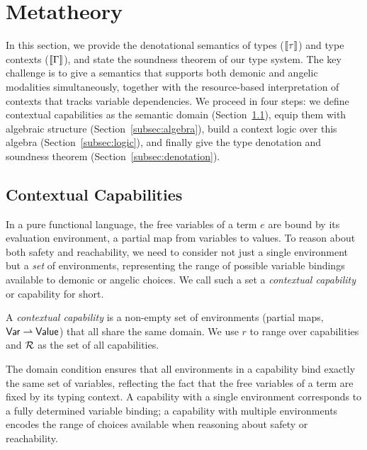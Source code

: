 \section{Metatheory} %
\label{sec:meta}

In this section, we provide the denotational semantics of types
($\llbracket {\tau} \rrbracket$) and type contexts ($\llbracket {\Gamma} \rrbracket$), and state the
soundness theorem of our type system.  The key challenge is to give a
semantics that supports both demonic and angelic modalities
simultaneously, together with the resource-based interpretation of
contexts that tracks variable dependencies.  We proceed in four
steps: we define contextual capabilities as the semantic domain
(Section~\ref{subsec:capabilities}), equip them with algebraic structure
(Section~\ref{subsec:algebra}), build a context logic over this algebra
(Section~\ref{subsec:logic}), and finally give the type denotation and
soundness theorem (Section~\ref{subsec:denotation}).

\subsection{Contextual Capabilities}%
\label{subsec:capabilities}

In a pure functional language, the free variables of a term $e$ are
bound by its evaluation environment, a partial map from variables to
values.  To reason about both safety and reachability, we need to
consider not just a single environment but a \emph{set} of
environments, representing the range of possible variable bindings
available to demonic or angelic choices.  We call such a set a
\emph{contextual capability} or capability for short.

\begin{definition}\label{def:contextual-capability}
  A \emph{contextual capability} is a non-empty set of environments
  (partial maps, $\mathsf{Var} \rightharpoonup \mathsf{Value}$) that all share the same
  domain.  We use $r$ to range over capabilities and $\mathcal{R}$ as the set
  of all capabilities.
\end{definition}

The domain condition ensures that all environments in a capability
bind exactly the same set of variables, reflecting the fact that the
free variables of a term are fixed by its typing context.  A
capability with a single environment corresponds to a fully determined
variable binding; a capability with multiple environments encodes the
range of choices available when reasoning about safety or
reachability.

